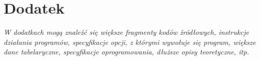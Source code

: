 
\chapter{Dodatek}
\label{chapter:dodatek_A}

\textit{W dodatkach mogą znaleźć się większe fragmenty kodów źródłowych, instrukcje działania programów, specyfikacje opcji, z którymi wywołuje się program, większe dane tabelaryczne, specyfikacje oprogramowania, dłuższe opisy teoretyczne, itp.}

